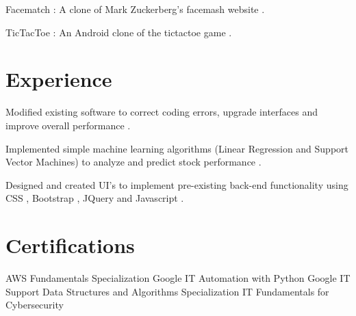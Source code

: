 \documentclass[]{deedy-resume-openfont}
\begin{document}
\begin{minipage}[t]{0.66\textwidth}
\begin{tightemize}
\item Facematch : A clone of Mark Zuckerberg's facemash website .
\item TicTacToe : An Android clone of the tictactoe game .
\end{tightemize}
\sectionsep


\section{Experience}
\vspace{\topsep}
\begin{tightemize}
\item Modified existing software to correct coding errors, upgrade interfaces and improve overall performance .
\item Implemented simple machine learning algorithms (Linear Regression and Support Vector Machines) to analyze and predict stock performance .
\end{tightemize}
\sectionsep

\vspace{\topsep}
\begin{tightemize}
\item Designed and created UI's to implement pre-existing back-end functionality using CSS , Bootstrap , JQuery and Javascript .
\end{tightemize}
\sectionsep


\section{Certifications} 
AWS Fundamentals Specialization
\textbullet{} Google IT Automation with Python
\textbullet{} Google IT Support
\textbullet{} Data Structures and Algorithms Specialization
\textbullet{} IT Fundamentals for Cybersecurity
\sectionsep

\end{minipage} 
\end{document}
